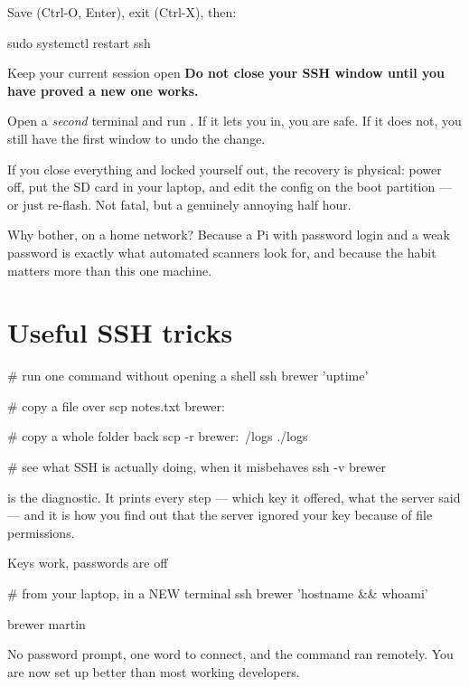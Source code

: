 Save (Ctrl-O, Enter), exit (Ctrl-X), then:

\begin{shell}
sudo systemctl restart ssh
\end{shell}

\begin{trap}{Keep your current session open}
\textbf{Do not close your SSH window until you have proved a new one works.}

Open a \emph{second} terminal and run . If it lets you in, you
are safe. If it does not, you still have the first window to undo the change.

If you close everything and locked yourself out, the recovery is physical: power
off, put the SD card in your laptop, and edit the config on the boot partition
--- or just re-flash. Not fatal, but a genuinely annoying half hour.
\end{trap}

Why bother, on a home network? Because a Pi with password login and a weak
password is exactly what automated scanners look for, and because the habit
matters more than this one machine.

\section{Useful SSH tricks}

\begin{shell}
# run one command without opening a shell
ssh brewer 'uptime'

# copy a file over
scp notes.txt brewer:~

# copy a whole folder back
scp -r brewer:~/logs ./logs

# see what SSH is actually doing, when it misbehaves
ssh -v brewer
\end{shell}

 is the diagnostic. It prints every step --- which key it offered,
what the server said --- and it is how you find out that the server ignored your
key because of file permissions.

\begin{checkpoint}{Keys work, passwords are off}
\begin{shell}
# from your laptop, in a NEW terminal
ssh brewer 'hostname && whoami'
\end{shell}

\begin{trace}
brewer
martin
\end{trace}

No password prompt, one word to connect, and the command ran remotely. You are
now set up better than most working developers.
\end{checkpoint}

